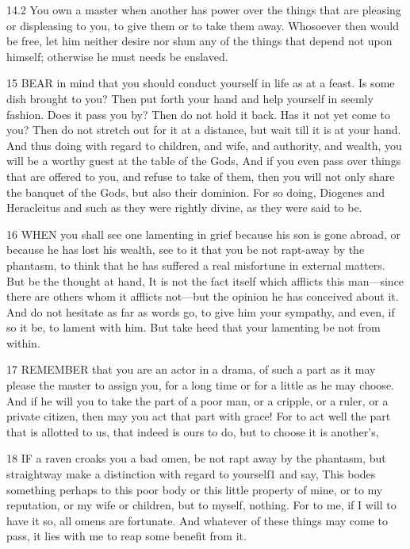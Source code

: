    14.2    You own a master when another has power over the things that are pleasing or displeasing to you, to give them or to take them away. Whosoever then would be free, let him neither desire nor shun any of the things that depend not upon himself; otherwise he must needs be enslaved.

   15   BEAR in mind that you should conduct yourself in life as at a feast. Is some dish brought to you? Then put forth your hand and help yourself in seemly fashion. Does it pass you by? Then do not hold it back. Has it not yet come to you? Then do not stretch out for it at a distance, but wait till it is at your hand. And thus doing with regard to children, and wife, and authority, and wealth, you will be a worthy guest at the table of the Gods, And if you even pass over things that are offered to you, and refuse to take of them, then you will not only share the banquet of the Gods, but also their dominion. For so doing, Diogenes and Heracleitus and such as they were rightly divine, as they were said to be.

   16   WHEN you shall see one lamenting in grief because his son is gone abroad, or because he has lost his wealth, see to it that you be not rapt-away by the phantasm, to think that he has suffered a real misfortune in external matters. But be the thought at hand, It is not the fact itself which afflicts this man—since there are others whom it afflicts not—but the opinion he has conceived about it. And do not hesitate as far as words go, to give him your sympathy, and even, if so it be, to lament with him. But take heed that your lamenting be not from within.

   17   REMEMBER that you are an actor in a drama, of such a part as it may please the master to assign you, for a long time or for a little as he may choose.  And if he will you to take the part of a poor man, or  a cripple, or a ruler, or a private citizen, then may you act that part with grace! For to act well the part that is allotted to us, that indeed is ours to do, but to choose it is another’s,

   18   IF a raven croaks you a bad omen, be not rapt away by the phantasm, but straightway make a distinction with regard to yourself1 and say, This bodes something perhaps to this poor body or this little property of mine, or to my reputation, or my wife or children, but to myself, nothing.  For to me, if I will to have it so, all omens are fortunate.  And whatever of these things may come to pass, it lies with me to reap some benefit from it.

